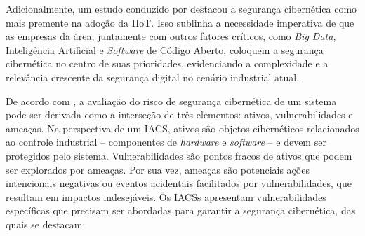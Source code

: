     Adicionalmente, um estudo conduzido por  destacou a segurança cibernética como mais premente na adoção da IIoT. Isso sublinha a necessidade imperativa de que as empresas da área, juntamente com outros fatores críticos, como \textit{Big Data}, Inteligência Artificial e \textit{Software} de Código Aberto, coloquem a segurança cibernética no centro de suas prioridades, evidenciando a complexidade e a relevância crescente da segurança digital no cenário industrial atual.

    De acordo com , a avaliação do risco de segurança cibernética de um sistema pode ser derivada como a interseção de três elementos: ativos, vulnerabilidades e ameaças. Na perspectiva de um IACS, ativos são objetos cibernéticos relacionados ao controle industrial -- componentes de \textit{hardware} e \textit{software} -- e devem ser protegidos pelo sistema. Vulnerabilidades são pontos fracos de ativos que podem ser explorados por ameaças. Por sua vez, ameaças são potenciais ações intencionais negativas ou eventos acidentais facilitados por vulnerabilidades, que resultam em impactos indesejáveis. Os IACSs apresentam vulnerabilidades específicas que precisam ser abordadas para garantir a segurança cibernética, das quais se destacam: 

